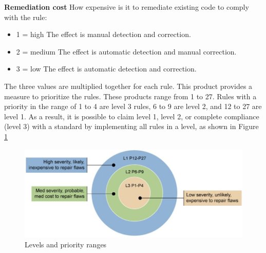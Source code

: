 \textbf{Remediation cost} How expensive is it to remediate existing code to comply with the rule:
\begin{itemize}
	\item 1 = high
	The effect is manual detection and correction.
	\item 2 = medium
	The effect is automatic detection and manual correction.
	\item 3 = low
	The effect is automatic detection and correction.
\end{itemize}
The three values are multiplied together for each rule. This product provides a measure to prioritize the rules. These products range from 1 to 27. Rules with a priority in the range of 1 to 4 are level 3 rules, 6 to 9 are level 2, and 12 to 27
are level 1. As a result, it is possible to claim level 1, level 2, or complete compliance (level 3)
with a standard by implementing all rules in a level, as shown in Figure \ref{fig:1}\cite{cert-c}
\begin{figure}[H]
	
	
	\centering
	\includegraphics[width=.9\linewidth]{Figures/lev}
	\caption{Levels and priority ranges}	 
	\label{fig:1}
	
\end{figure}

